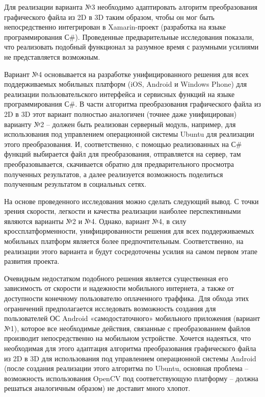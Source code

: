 Для реализации варианта №3 необходимо адаптировать алгоритм преобразования графического файла из 2D в 3D таким образом, чтобы он мог быть непосредственно интегрирован в Xamarin-проект (разработка на языке программирования С\#). Проведенные предварительные исследования показали, что реализовать подобный функционал за разумное время с разумными усилиями не представляется возможным.

Вариант №4 основывается на разработке унифицированного решения для всех поддерживаемых мобильных платформ (iOS, Android и Windows Phone) для реализации пользовательского интерфейса и сервисных функций на языке программирования С\#. В части алгоритма преобразования графического файла из 2D в 3D этот вариант полностью аналогичен (точнее даже унифицирован) варианту №2 – должен быть реализован серверный модуль, например, для использования под управлением операционной системы Ubuntu для реализации этого преобразования. И, соответственно, с помощью реализованных на С\# функций выбирается файл для преобразования, отправляется на сервер, там преобразовывается, скачивается обратно для предварительного просмотра полученных результатов, а далее реализуется возможность поделиться полученным результатом в социальных сетях.

На основе проведенного исследования можно сделать следующий вывод. С точки зрения скорости, легкости и качества реализации наиболее перспективными являются варианты №2 и №4. Однако, вариант №4, в силу кроссплатформенности, унифицированности решения для всех поддерживаемых мобильных платформ является более предпочтительным. Соответственно, на реализации этого варианта и будут сосредоточены усилия на самом первом этапе развития проекта. 

Очевидным недостатком подобного решения является существенная его зависимость от скорости и надежности мобильного интернета, а также от доступности конечному пользователю оплаченного траффика. Для обхода этих ограничений предполагается исследовать возможность создания для пользователей ОС Android «самодостаточного» мобильного приложения (вариант №1), которое все необходимые действия, связанные с преобразованием файлов производит непосредственно на мобильном устройстве. Хочется надеяться, что необходимая для этого адаптация алгоритма преобразования графического файла из 2D в 3D для использования под управлением операционной системы Android (после создания реализации этого алгоритма по Ubuntu, основная проблема – возможность использования OpenCV под соответствующую платформу – должна решаться аналогичным образом) не доставит много хлопот.
